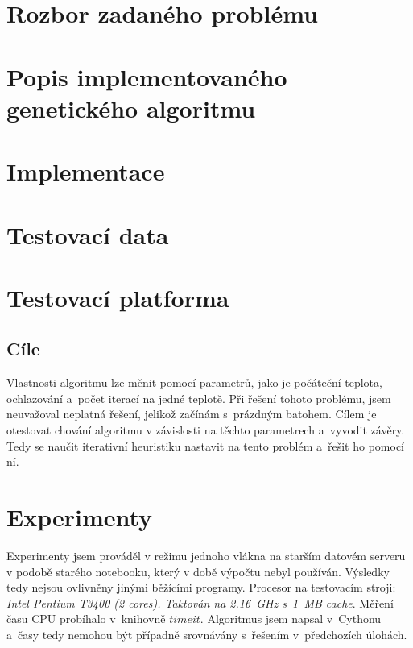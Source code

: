 \documentclass[11pt]{article}
\begin{document}
\section{Rozbor zadaného problému}\label{kap:rozbor}

\section{Popis implementovaného genetického algoritmu}\label{kap:popisALG}

\section{Implementace}\label{kap:implementace}

\section{Testovací data}\label{kap:data}

\section{Testovací platforma}\label{kap:platform}

\subsection{Cíle}\label{kap:cil}

Vlastnosti algoritmu lze měnit pomocí parametrů, jako je počáteční teplota, ochlazování a~počet iterací na jedné teplotě. Při řešení tohoto problému, jsem neuvažoval neplatná řešení, jelikož začínám s~prázdným batohem. Cílem je otestovat chování algoritmu v závislosti na těchto parametrech a~vyvodit závěry. Tedy se naučit iterativní heuristiku nastavit na tento problém a~řešit ho pomocí ní. 


\section{Experimenty}\label{kap:experiments}


Experimenty jsem prováděl v režimu jednoho vlákna na starším datovém serveru v podobě starého notebooku, který v době výpočtu nebyl používán. Výsledky tedy nejsou ovlivněny jinými běžícími programy. Procesor na testovacím stroji: \textit{Intel Pentium T3400 (2 cores). Taktován na 2.16~GHz s~1~MB cache}.
Měření času CPU probíhalo v~knihovně $timeit$. Algoritmus jsem napsal v~Cythonu a~časy tedy nemohou být případně srovnávány s~řešením v~předchozích úlohách.
\end{document}

